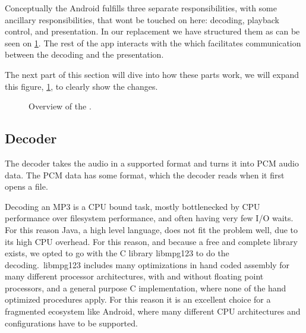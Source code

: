 Conceptually the Android  fulfills three separate
responsibilities, with some ancillary responsibilities, that wont be
touched on here: decoding, playback control, and presentation. In our
replacement we have structured them as can be seen on
\cref{fig:mediaplayerParts}. The rest of the app interacts with the  which facilitates communication between the decoding and the
presentation.

The next part of this section will dive into how these parts work, we will expand this figure, \cref{fig:mediaplayerParts}, to clearly show the changes.


\begin{figure}[ht]
	\centering
	\caption{Overview of the .}\label{fig:mediaplayerParts}
\end{figure}

\subsection{Decoder}
\label{subsec:decoder}

The decoder takes the audio in a supported format and turns it into
\ac{PCM} audio data. The \ac{PCM} data has some format, which the
decoder reads when it first opens a file.

Decoding an MP3 is a CPU bound task, mostly bottlenecked by CPU
performance over filesystem performance, and often having very few I/O
waits. For this reason Java, a high level language, does not fit the
problem well, due to its high CPU overhead. For this reason, and because
a free and complete library exists, we opted to go with the C library
libmpg123 to do the decoding.\ libmpg123 includes many optimizations in
hand coded assembly for many different processor architectures, with and without
floating point processors, and a general purpose C implementation, where
none of the hand optimized procedures apply. For this reason it is an
excellent choice for a fragmented ecosystem like Android, where many
different CPU architectures and configurations have to be supported.

